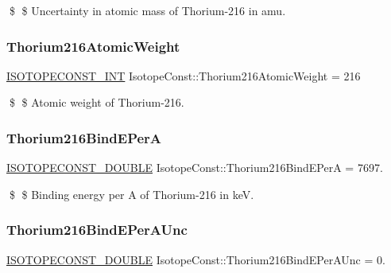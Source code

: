 \$ \$ Uncertainty in atomic mass of Thorium-\/216 in amu. \mbox{\label{group___isotope_const-_thorium-_th216_gacda89ab72abac844a42eb2b8e8cb66b4}} 
\subsubsection{\texorpdfstring{Thorium216\+Atomic\+Weight}{Thorium216AtomicWeight}}
{\footnotesize\ttfamily \mbox{\hyperlink{group___isotope_const-_macros_ga5f18360b3e99483a35c32d789e62621c}{I\+S\+O\+T\+O\+P\+E\+C\+O\+N\+S\+T\+\_\+\+I\+NT}} Isotope\+Const\+::\+Thorium216\+Atomic\+Weight = 216}

\$ \$ Atomic weight of Thorium-\/216. \mbox{\label{group___isotope_const-_thorium-_th216_gae066a44ab8c755cfd3cf72cc94b4009b}} 
\subsubsection{\texorpdfstring{Thorium216\+Bind\+E\+PerA}{Thorium216BindEPerA}}
{\footnotesize\ttfamily \mbox{\hyperlink{group___isotope_const-_macros_ga8f45a7272ce02c0b4c65c44636ed719a}{I\+S\+O\+T\+O\+P\+E\+C\+O\+N\+S\+T\+\_\+\+D\+O\+U\+B\+LE}} Isotope\+Const\+::\+Thorium216\+Bind\+E\+PerA = 7697.}

\$ \$ Binding energy per A of Thorium-\/216 in keV. \mbox{\label{group___isotope_const-_thorium-_th216_gacc359475d3c9b3b7b4eaeb1e7c3aa847}} 
\subsubsection{\texorpdfstring{Thorium216\+Bind\+E\+Per\+A\+Unc}{Thorium216BindEPerAUnc}}
{\footnotesize\ttfamily \mbox{\hyperlink{group___isotope_const-_macros_ga8f45a7272ce02c0b4c65c44636ed719a}{I\+S\+O\+T\+O\+P\+E\+C\+O\+N\+S\+T\+\_\+\+D\+O\+U\+B\+LE}} Isotope\+Const\+::\+Thorium216\+Bind\+E\+Per\+A\+Unc = 0.}

